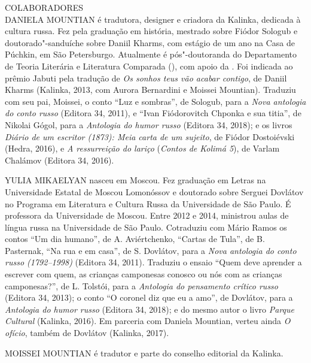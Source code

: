 \newpage
\small\MyriadPro
\label{colaboradores}

\noindent{}COLABORADORES\\

\noindent{}DANIELA MOUNTIAN é tradutora, designer e criadora da Kalinka, de­dicada
à cultura russa. Fez pela  graduação em história, mestrado sobre
Fiódor Sologub e doutorado"-sanduíche sobre Daniil Kharms, com estágio de
um ano na Casa de Púchkin, em São Petersburgo. Atualmente é
pós"-doutoranda do Departamento de Teoria Literária e Literatura
Comparada (), com apoio da . Foi indicada ao prêmio Jabuti pela
tradução de \emph{Os sonhos teus vão acabar contigo}, de Daniil Kharms
(Kalinka, 2013, com Aurora Bernardini e Mois­sei Mountian). Traduziu com
seu pai, Moissei, o conto ``Luz e sombras'', de Sologub, para a
\emph{Nova antologia do conto russo} (Editora 34, 2011), e ``Ivan
Fiódorovitch Chponka e sua titia'', de Nikolai Gógol, para a
\emph{Antologia do humor russo} (Editora 34, 2018); e os livros
\emph{Diário de um escritor (1873): Meia carta de um sujeito}, de Fiódor
Dostoiévski (Hedra, 2016), e \emph{A ressurreição do lariço}
(\emph{Contos de Kolimá 5}), de Varlam Chalámov (Editora 34, 2016).


\medskip

\noindent{}YULIA MIKAELYAN nasceu em Moscou. Fez graduação em Letras na
Universidade Estatal de Moscou Lomonóssov e doutorado sobre Serguei
Dovlátov no Programa em Literatura e Cultura Russa da Universidade de
São Paulo. É professora da Universidade  de Moscou. Entre 2012 e
2014, ministrou aulas de língua russa na Universidade de São Paulo.
Cotraduziu com Mário Ramos os contos ``Um dia humano'', de A.
Aviértchenko, ``Cartas de Tula'', de B. Pasternak, ``Na rua e em casa'',
de S. Dovlátov, para a \emph{Nova antologia do conto russo (1792--1998)}
(Editora 34, 2011). Traduziu o ensaio ``Quem deve aprender a escrever
com quem, as crianças camponesas conosco ou nós com as crianças
campone­sas?'', de L. Tolstói, para a \emph{Antologia do pensamento
crítico russo} (Editora 34, 2013); o conto ``O coronel diz que eu a
amo'', de Dovlátov, para a \emph{Antologia do humor russo} (Editora 34,
2018); e do mesmo autor o livro \emph{Parque Cultural} (Kalinka, 2016).
Em parceria com Daniela Mountian, verteu ainda \emph{O ofício}, também
de Dovlátov (Kalinka, 2017).

\medskip

\noindent{}MOISSEI MOUNTIAN é tradutor e parte do conselho editorial da Kalinka.

